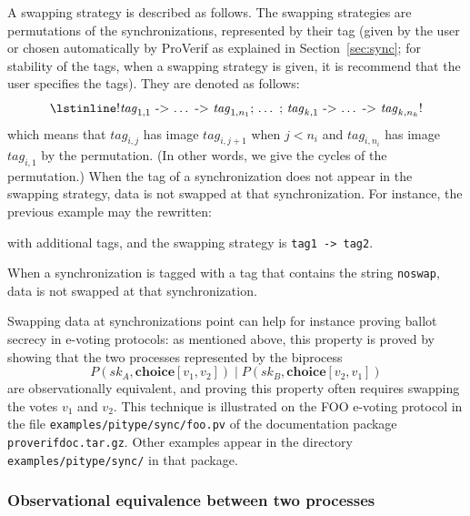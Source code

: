 \documentclass{book}
\begin{document}
A swapping strategy is described as follows.
The swapping strategies are permutations of the synchronizations, represented by their tag (given by the user or chosen automatically by ProVerif as explained in Section~\ref{sec:sync}; for stability of the tags, when a swapping strategy is given, it is recommend that the user specifies the tags). They are denoted as
follows:
\[\text{\lstinline!$\mathit{tag}_{1,1}$\ ->\ $\dots$\ ->\ $\mathit{tag}_{1,n_1}$;
$\dots$ ; $\mathit{tag}_{k,1}$\ ->\ $\dots$\ ->\ $\mathit{tag}_{k,n_k}$!}\]
which means that $\mathit{tag}_{i,j}$ has image $\mathit{tag}_{i,j+1}$
when $j < n_i$ and $\mathit{tag}_{i,n_i}$ has image $\mathit{tag}_{i,1}$
by the permutation. (In other words, we give the cycles of the permutation.)
When the tag of a synchronization does not appear in the swapping strategy,
data is not swapped at that synchronization.
For instance, the previous example may the rewritten:

with additional tags, and the swapping strategy is
\lstinline!tag1 -> tag2!.

When a synchronization is tagged with a tag that contains the string
\lstinline!noswap!, data is not swapped at that synchronization.

Swapping data at synchronizations point can help for instance proving
ballot secrecy in e-voting protocols: as mentioned above, this property
is proved by showing that the two processes represented by the biprocess
\[P(sk_A, \mathbf{choice}[v_1,v_2]) \mid P(sk_B, \mathbf{choice}[v_2,v_1]) \]
are observationally equivalent, and proving this property often
requires swapping the votes $v_1$ and $v_2$. This technique
is illustrated on the FOO e-voting protocol in the file
{\tt examples/pitype/sync/foo.pv} of the documentation package
{\tt proverifdoc\V.tar.gz}.
Other examples appear in the directory {\tt examples/pitype/sync/}
in that package.

\subsubsection{Observational equivalence between two processes}
\end{document}
